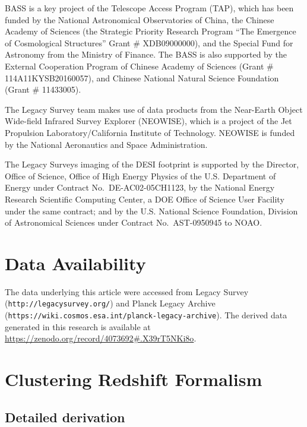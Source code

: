 \documentclass[a4paper,usenatbib]{mnras}
\begin{document}
BASS is a key project of the Telescope Access Program (TAP), which has been funded by the National Astronomical Observatories of China, the Chinese Academy of Sciences (the Strategic Priority Research Program ``The Emergence of Cosmological Structures'' Grant \# XDB09000000), and the Special Fund for Astronomy from the Ministry of Finance. The BASS is also supported by the External Cooperation Program of Chinese Academy of Sciences (Grant \# 114A11KYSB20160057), and Chinese National Natural Science Foundation (Grant \# 11433005).

The Legacy Survey team makes use of data products from the Near-Earth Object Wide-field Infrared Survey Explorer (NEOWISE), which is a project of the Jet Propulsion Laboratory/California Institute of Technology. NEOWISE is funded by the National Aeronautics and Space Administration.

The Legacy Surveys imaging of the DESI footprint is supported by the Director, Office of Science, Office of High Energy Physics of the U.S. Department of Energy under Contract No.\ DE-AC02-05CH1123, by the National Energy Research Scientific Computing Center, a DOE Office of Science User Facility under the same contract; and by the U.S. National Science Foundation, Division of Astronomical Sciences under Contract No.\ AST-0950945 to NOAO.

\section*{Data Availability}
The data underlying this article were accessed from Legacy Survey (\texttt{http://legacysurvey.org/}) and Planck Legacy Archive \\ (\texttt{https://wiki.cosmos.esa.int/planck-legacy-archive}). The derived data generated in this research is available at \url{https://zenodo.org/record/4073692#.X39rT5NKi8o}.




\appendix

%

\section{Clustering Redshift Formalism}\label{app:dndz}

\subsection{Detailed derivation}
\end{document}
